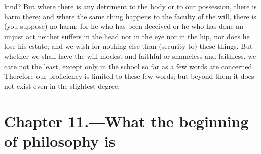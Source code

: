 \documentclass[12pt]{article}
\begin{document}
kind? But where there is any detriment to the body or to our possession, there is harm there; and where the same thing happens to the faculty of the will, there is (you suppose) no harm; for he who has been deceived or he who has done an unjust act neither suffers in the head nor in the eye nor in the hip, nor does he lose his estate; and we wish for nothing else than (security to) these things. But whether we shall have the will modest and faithful or shameless and faithless, we care not the least, except only in the school so far as a few words are concerned. Therefore our proficiency is limited to these few words; but beyond them it does not exist even in the slightest degree.

\section*{Chapter 11.---What the beginning of philosophy is}
\end{document}
